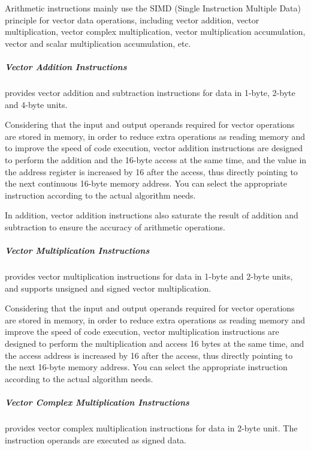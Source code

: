 \documentclass[main\_\_EN.tex]{subfiles}
\begin{document}
Arithmetic instructions mainly use the SIMD (Single Instruction Multiple Data) principle for vector data operations, including vector addition, vector multiplication, vector complex multiplication, vector multiplication accumulation, vector and scalar multiplication accumulation, etc.

\subparagraph{Vector Addition Instructions}

\chipname{} provides vector addition and subtraction instructions for data in 1-byte, 2-byte and 4-byte units.

Considering that the input and output operands required for vector operations are stored in memory, in order to reduce extra operations as reading memory and to improve the speed of code execution, vector addition instructions are designed to perform the addition and the 16-byte access at the same time, and the value in the address register is increased by 16 after the access, thus directly pointing to the next continuous 16-byte memory address. You can select the appropriate instruction according to the actual algorithm needs.

In addition, vector addition instructions also saturate the result of addition and subtraction to ensure the accuracy of arithmetic operations.




\subparagraph{Vector Multiplication Instructions}

\chipname{} provides vector multiplication instructions for data in 1-byte and 2-byte units, and supports unsigned and signed vector multiplication.

Considering that the input and output operands required for vector operations are stored in memory, in order to reduce extra operations as reading memory and improve the speed of code execution, vector multiplication instructions are designed to perform the multiplication and access 16 bytes at the same time, and the access address is increased by 16 after the access, thus directly pointing to the next 16-byte memory address. You can select the appropriate instruction according to the actual algorithm needs.




\subparagraph{Vector Complex Multiplication Instructions}

\chipname{} provides vector complex multiplication instructions for data in 2-byte unit. The instruction operands are executed as signed data.
\end{document}
